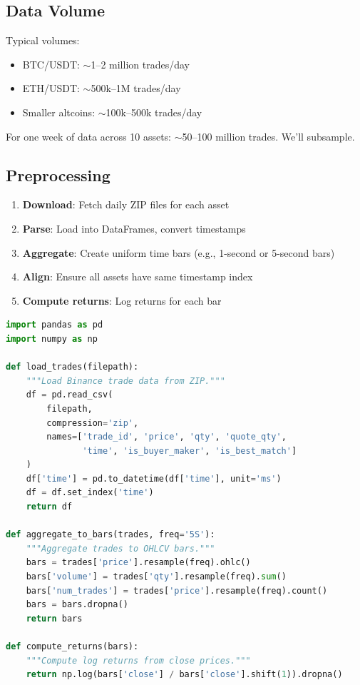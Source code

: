 \documentclass[11pt, a4paper]{article}
\begin{document}
\subsection{Data Volume}

Typical volumes:
\begin{itemize}
    \item BTC/USDT: $\sim$1--2 million trades/day
    \item ETH/USDT: $\sim$500k--1M trades/day
    \item Smaller altcoins: $\sim$100k--500k trades/day
\end{itemize}

For one week of data across 10 assets: $\sim$50--100 million trades. We'll subsample.

\subsection{Preprocessing}

\begin{enumerate}
    \item \textbf{Download}: Fetch daily ZIP files for each asset
    \item \textbf{Parse}: Load into DataFrames, convert timestamps
    \item \textbf{Aggregate}: Create uniform time bars (e.g., 1-second or 5-second bars)
    \item \textbf{Align}: Ensure all assets have same timestamp index
    \item \textbf{Compute returns}: Log returns for each bar
\end{enumerate}

\begin{lstlisting}[language=Python]
import pandas as pd
import numpy as np

def load_trades(filepath):
    """Load Binance trade data from ZIP."""
    df = pd.read_csv(
        filepath,
        compression='zip',
        names=['trade_id', 'price', 'qty', 'quote_qty', 
               'time', 'is_buyer_maker', 'is_best_match']
    )
    df['time'] = pd.to_datetime(df['time'], unit='ms')
    df = df.set_index('time')
    return df

def aggregate_to_bars(trades, freq='5S'):
    """Aggregate trades to OHLCV bars."""
    bars = trades['price'].resample(freq).ohlc()
    bars['volume'] = trades['qty'].resample(freq).sum()
    bars['num_trades'] = trades['price'].resample(freq).count()
    bars = bars.dropna()
    return bars

def compute_returns(bars):
    """Compute log returns from close prices."""
    return np.log(bars['close'] / bars['close'].shift(1)).dropna()
\end{lstlisting}
\end{document}

